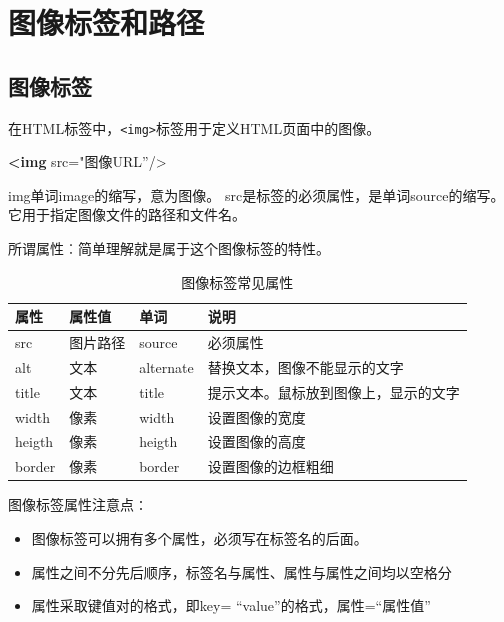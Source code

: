 \documentclass[
]{book}
\newenvironment{Shaded}{\begin{snugshade}}{\end{snugshade}}
\newcommand{\KeywordTok}[1]{\textcolor[rgb]{0.13,0.29,0.53}{\textbf{#1}}}
\newcommand{\OtherTok}[1]{\textcolor[rgb]{0.56,0.35,0.01}{#1}}
\newcommand{\StringTok}[1]{\textcolor[rgb]{0.31,0.60,0.02}{#1}}
\providecommand{\tightlist}{%
  \setlength{\itemsep}{0pt}\setlength{\parskip}{0pt}}
\begin{document}
\hypertarget{ux56feux50cfux6807ux7b7eux548cux8defux5f84}{%
\section{图像标签和路径}\label{ux56feux50cfux6807ux7b7eux548cux8defux5f84}}

\hypertarget{ux56feux50cfux6807ux7b7e}{%
\subsection{图像标签}\label{ux56feux50cfux6807ux7b7e}}

在HTML标签中，\texttt{\textless{}img\textgreater{}}标签用于定义HTML页面中的图像。

\begin{Shaded}
\begin{Highlighting}[]
\KeywordTok{\textless{}img}\OtherTok{ src=}\StringTok{"图像URL”/\textgreater{}}
\end{Highlighting}
\end{Shaded}

img单词image的缩写，意为图像。
src是标签的必须属性，是单词source的缩写。它用于指定图像文件的路径和文件名。

所谓属性︰简单理解就是属于这个图像标签的特性。

\begin{table}

\caption{\label{tab:unnamed-chunk-9}图像标签常见属性}
\centering
\begin{tabular}[t]{llll}
\toprule
属性 & 属性值 & 单词 & 说明\\
\midrule
src & 图片路径 & source & 必须属性\\
alt & 文本 & alternate & 替换文本，图像不能显示的文字\\
title & 文本 & title & 提示文本。鼠标放到图像上，显示的文字\\
width & 像素 & width & 设置图像的宽度\\
heigth & 像素 & heigth & 设置图像的高度\\
\addlinespace
border & 像素 & border & 设置图像的边框粗细\\
\bottomrule
\end{tabular}
\end{table}

图像标签属性注意点∶

\begin{itemize}
\tightlist
\item
  图像标签可以拥有多个属性，必须写在标签名的后面。
\item
  属性之间不分先后顺序，标签名与属性、属性与属性之间均以空格分
\item
  属性采取键值对的格式，即key= ``value''的格式，属性=``属性值''
\end{itemize}
\end{document}
